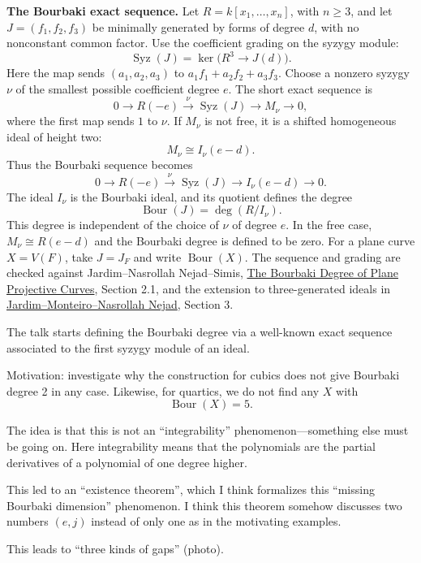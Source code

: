 \medskip\noindent
\textbf{The Bourbaki exact sequence.}
Let $R=k[x_1,\ldots,x_n]$, with $n\geq3$,
and let $J=(f_1,f_2,f_3)$ be minimally
generated by forms of degree $d$, with
no nonconstant common factor. Use the
coefficient grading on the syzygy module:
$$
\operatorname{Syz}(J)
=\ker\bigl(R^3\longrightarrow J(d)\bigr).
$$
Here the map sends $(a_1,a_2,a_3)$ to
$a_1f_1+a_2f_2+a_3f_3$.
Choose a nonzero syzygy $\nu$ of the
smallest possible coefficient degree $e$.
The short exact sequence is
$$
0\longrightarrow R(-e)
\xrightarrow{\nu}\operatorname{Syz}(J)
\longrightarrow M_\nu\longrightarrow0,
$$
where the first map sends $1$ to $\nu$.
If $M_\nu$ is not free, it is a shifted
homogeneous ideal of height two:
$$
M_\nu\cong I_\nu(e-d).
$$
Thus the Bourbaki sequence becomes
$$
0\longrightarrow R(-e)
\xrightarrow{\nu}\operatorname{Syz}(J)
\longrightarrow I_\nu(e-d)
\longrightarrow0.
$$
The ideal $I_\nu$ is the Bourbaki ideal,
and its quotient defines the degree
$$
\operatorname{Bour}(J)=\deg(R/I_\nu).
$$
This degree is independent of the choice
of $\nu$ of degree $e$. In the free case,
$M_\nu\cong R(e-d)$ and the Bourbaki
degree is defined to be zero.
For a plane curve $X=V(F)$, take
$J=J_F$ and write
$\operatorname{Bour}(X)$.
The sequence and grading are checked
against Jardim--Nasrollah Nejad--Simis,
\href{https://arxiv.org/abs/2308.11467}
{The Bourbaki Degree of Plane Projective
Curves}, Section 2.1, and the extension
to three-generated ideals in
\href{https://arxiv.org/abs/2604.04252}
{Jardim--Monteiro--Nasrollah Nejad},
Section 3.

The talk starts defining the Bourbaki degree
via a well-known exact sequence associated
to the first syzygy module of an ideal.

Motivation: investigate why the construction
for cubics does not give Bourbaki degree 2
in any case. Likewise, for quartics, we do
not find any $X$ with
$$
\operatorname{Bour}(X)=5.
$$

The idea is that this is not an
``integrability'' phenomenon---something else
must be going on. Here integrability
means that the polynomials are the partial
derivatives of a polynomial of one degree
higher.

This led to an ``existence theorem'',
which I think formalizes this ``missing
Bourbaki dimension'' phenomenon.
I think this theorem somehow discusses
two numbers $(e,j)$ instead of only one
as in the motivating examples.

This leads to ``three kinds of gaps''
(photo).

